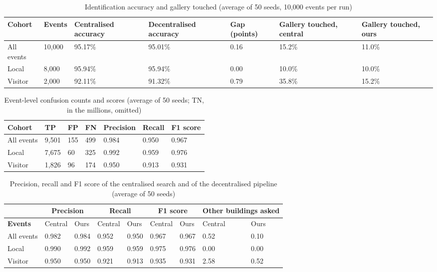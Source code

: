 \documentclass[12pt,a4paper,oneside]{report}
\begin{document}
\begin{table}[htbp]
\centering
\caption{Identification accuracy and gallery touched (average of 50 seeds, 10,000 events per run)}\label{tab:central}
{\small\setlength{\tabcolsep}{4pt}\renewcommand{\arraystretch}{1.2}
\begin{tabular}{|p{2.5cm}|p{1.4cm}|p{2.1cm}|p{2.3cm}|p{1.3cm}|p{1.9cm}|p{1.9cm}|}\hline
\textbf{Cohort} & \textbf{Events} & \textbf{Centralised accuracy} & \textbf{Decentralised accuracy} & \textbf{Gap (points)} & \textbf{Gallery touched, central} & \textbf{Gallery touched, ours}\\\hline
All events & 10,000 & 95.17\% & 95.01\% & 0.16 & 15.2\% & 11.0\%\\\hline
Local & 8,000 & 95.94\% & 95.94\% & 0.00 & 10.0\% & 10.0\%\\\hline
Visitor & 2,000 & 92.11\% & 91.32\% & 0.79 & 35.8\% & 15.2\%\\\hline
\end{tabular}}
\end{table}

\begin{table}[htbp]
\centering
\caption{Event-level confusion counts and scores (average of 50 seeds; TN, in the millions, omitted)}\label{tab:events}
{\small\setlength{\tabcolsep}{4pt}\renewcommand{\arraystretch}{1.2}
\begin{tabular}{|p{2.97cm}|p{1.78cm}|p{1.48cm}|p{1.48cm}|p{1.98cm}|p{1.78cm}|p{1.58cm}|}\hline
\textbf{Cohort} & \textbf{TP} & \textbf{FP} & \textbf{FN} & \textbf{Precision} & \textbf{Recall} & \textbf{F1 score}\\\hline
All events & 9,501 & 155 & 499 & 0.984 & 0.950 & 0.967\\\hline
Local & 7,675 & 60 & 325 & 0.992 & 0.959 & 0.976\\\hline
Visitor & 1,826 & 96 & 174 & 0.950 & 0.913 & 0.931\\\hline
\end{tabular}}
\end{table}

\begin{table}[htbp]
\centering
\caption{Precision, recall and F1 score of the centralised search and of the decentralised pipeline (average of 50 seeds)}\label{tab:censcores}
{\small\setlength{\tabcolsep}{3pt}\renewcommand{\arraystretch}{1.2}
\begin{tabular}{|p{3.0cm}|p{1.2cm}|p{1.2cm}|p{1.2cm}|p{1.2cm}|p{1.2cm}|p{1.2cm}|p{1.2cm}|p{1.2cm}|}\hline
 & \multicolumn{2}{c|}{\textbf{Precision}} & \multicolumn{2}{c|}{\textbf{Recall}} & \multicolumn{2}{c|}{\textbf{F1 score}} & \multicolumn{2}{c|}{\textbf{Other buildings asked}}\\\hline
\textbf{Events} & Central & Ours & Central & Ours & Central & Ours & Central & Ours\\\hline
All events & 0.982 & 0.984 & 0.952 & 0.950 & 0.967 & 0.967 & 0.52 & 0.10\\\hline
Local & 0.990 & 0.992 & 0.959 & 0.959 & 0.975 & 0.976 & 0.00 & 0.00\\\hline
Visitor & 0.950 & 0.950 & 0.921 & 0.913 & 0.935 & 0.931 & 2.58 & 0.52\\\hline
\end{tabular}}
\end{table}
\end{document}
